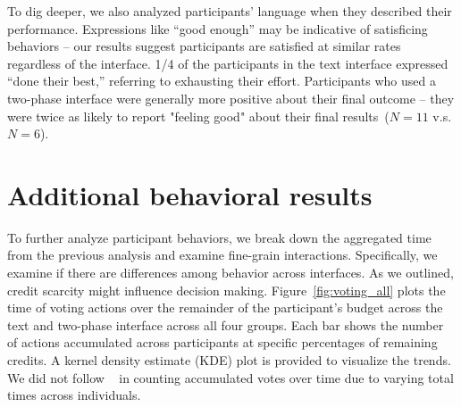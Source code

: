 To dig deeper, we also analyzed participants' language when they described their performance. Expressions like ``good enough'' may be indicative of satisficing behaviors -- our results suggest participants are satisfied at similar rates regardless of the interface. 1/4 of the participants in the text interface expressed ``done their best,'' referring to exhausting their effort. Participants who used a two-phase interface were generally more positive about their final outcome -- they were twice as likely to report "feeling good" about their final results~($N=11$ v.s. $N=6$).



\section{Additional behavioral results}
\label{apdx:additional_results_behavior}
To further analyze participant behaviors, we break down the aggregated time from the previous analysis and examine fine-grain interactions. Specifically, we examine if there are differences among behavior across interfaces. As we outlined, credit scarcity might influence decision making.  Figure~\ref{fig:voting_all} plots the time of voting actions over the remainder of the participant's budget across the text and two-phase interface across all four groups. Each bar shows the number of actions accumulated across participants at specific percentages of remaining credits. A kernel density estimate (KDE) plot is provided to visualize the trends. We did not follow ~\textcite{quarfoot2017quadratic} in counting accumulated votes over time due to varying total times across individuals.

